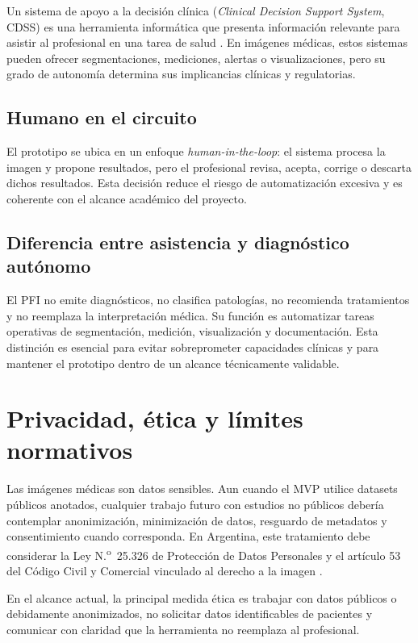 Un sistema de apoyo a la decisión clínica (\textit{Clinical Decision Support System}, CDSS) es una herramienta informática que presenta información relevante para asistir al profesional en una tarea de salud \parencite{berner_cdss_2007}. En imágenes médicas, estos sistemas pueden ofrecer segmentaciones, mediciones, alertas o visualizaciones, pero su grado de autonomía determina sus implicancias clínicas y regulatorias.

\subsection{Humano en el circuito}

El prototipo se ubica en un enfoque \textit{human-in-the-loop}: el sistema procesa la imagen y propone resultados, pero el profesional revisa, acepta, corrige o descarta dichos resultados. Esta decisión reduce el riesgo de automatización excesiva y es coherente con el alcance académico del proyecto.

\subsection{Diferencia entre asistencia y diagnóstico autónomo}

El PFI no emite diagnósticos, no clasifica patologías, no recomienda tratamientos y no reemplaza la interpretación médica. Su función es automatizar tareas operativas de segmentación, medición, visualización y documentación. Esta distinción es esencial para evitar sobreprometer capacidades clínicas y para mantener el prototipo dentro de un alcance técnicamente validable.

\section{Privacidad, ética y límites normativos}

Las imágenes médicas son datos sensibles. Aun cuando el MVP utilice datasets públicos anotados, cualquier trabajo futuro con estudios no públicos debería contemplar anonimización, minimización de datos, resguardo de metadatos y consentimiento cuando corresponda. En Argentina, este tratamiento debe considerar la Ley N.\textsuperscript{o}~25.326 de Protección de Datos Personales y el artículo 53 del Código Civil y Comercial vinculado al derecho a la imagen \parencite{argentina_ley_25326,argentina_codigo_civil_imagen}.

En el alcance actual, la principal medida ética es trabajar con datos públicos o debidamente anonimizados, no solicitar datos identificables de pacientes y comunicar con claridad que la herramienta no reemplaza al profesional.

